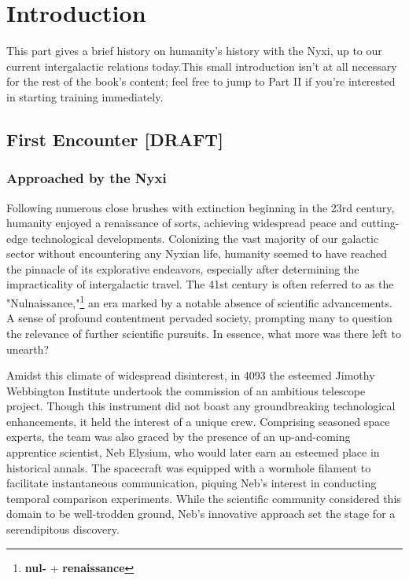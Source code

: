 \part{Introduction}

\begin{remark}
	This part gives a brief history on humanity's history with the Nyxi, up to our
	current intergalactic relations today.This small introduction isn't at all
	necessary for the rest of the book's content; feel free to jump to Part II if
	you're interested in starting training immediately.%
\end{remark}



\chapter{First Encounter [DRAFT]}

\section{Approached by the Nyxi}

Following numerous close brushes with extinction beginning in the 23rd century,
humanity enjoyed a renaissance of sorts, achieving widespread peace and
cutting-edge technological developments. Colonizing the vast majority of our
galactic sector without encountering any Nyxian life, humanity seemed to have
reached the pinnacle of its explorative endeavors, especially after determining
the impracticality of intergalactic travel. The 41st century is often referred
to as the "Nulnaissance,"\footnote{\textbf{nul-} + \textbf{renaissance}} an era
marked by a notable absence of scientific advancements. A sense of profound
contentment pervaded society, prompting many to question the relevance of
further scientific pursuits. In essence, what more was there left to unearth?

Amidst this climate of widespread disinterest, in 4093 the esteemed Jimothy
Webbington Institute undertook the commission of an ambitious telescope
project. Though this instrument did not boast any groundbreaking technological
enhancements, it held the interest of a unique crew. Comprising seasoned space
experts, the team was also graced by the presence of an up-and-coming
apprentice scientist, Neb Elysium, who would later earn an esteemed place in
historical annals. The spacecraft was equipped with a wormhole filament to
facilitate instantaneous communication, piquing Neb's interest in conducting
temporal comparison experiments. While the scientific community considered this
domain to be well-trodden ground, Neb's innovative approach set the stage for a
serendipitous discovery.

